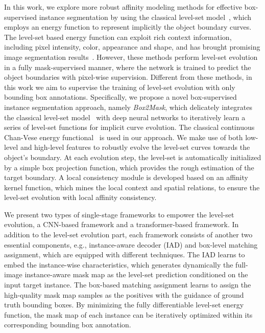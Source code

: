 \documentclass[12pt,onecolumn,letterpaper]{article}
\begin{document}
In this work, we explore more robust affinity modeling methods for effective box-supervised instance segmentation by using the classical level-set model~\cite{levelset1995a, osher1988fronts, tip2001_active_contour}, which employs an energy function to represent implicitly the object boundary curves. The level-set based energy function can exploit rich context information, including pixel intensity, color, appearance and shape, and has brought promising image segmentation results~\cite{eccv2020levelset, yuan2020deep, cvpr2019deeplevelsetevolution, CVPR2017hudeep}. However, these methods perform level-set evolution in a fully mask-supervised manner, where the network is trained to predict the object boundaries with pixel-wise supervision. Different from these methods, in this work we aim to supervise the training of level-set evolution with only bounding box annotations.  
Specifically, we propose a novel box-supervised instance segmentation approach, namely \textit{Box2Mask}, which delicately integrates the classical level-set model~\cite{osher1988fronts,tip2001_active_contour} with deep neural networks to iteratively learn a series of level-set functions for implicit curve evolution.
The classical continuous Chan-Vese energy functional~\cite{tip2001_active_contour} is used in our approach. 
We make use of both low-level and high-level features to robustly evolve the level-set curves towards the object's boundary. 
At each evolution step, the level-set is automatically initialized by a simple box projection function, which provides the rough estimation of the target boundary.
A local consistency module is developed based on an affinity kernel function, which mines the local context and spatial relations, to ensure the level-set evolution with local affinity consistency.


We present two types of single-stage frameworks to empower the level-set evolution,  
a CNN-based framework and a transformer-based framework. In addition to the level-set evolution part, each framework consists of another two essential components, e.g., instance-aware decoder (IAD) and box-level matching assignment, which are  equipped with different techniques. The IAD learns to embed the instance-wise characteristics, which generates dynamically the full-image instance-aware mask map as the level-set prediction conditioned on the input target instance. The  box-based matching assignment learns to assign the high-quality mask map samples as the positives with the guidance of ground truth bounding boxes.
By minimizing the fully differentiable level-set energy function, the mask map of each instance can be iteratively optimized within its corresponding bounding box annotation.
\end{document}
